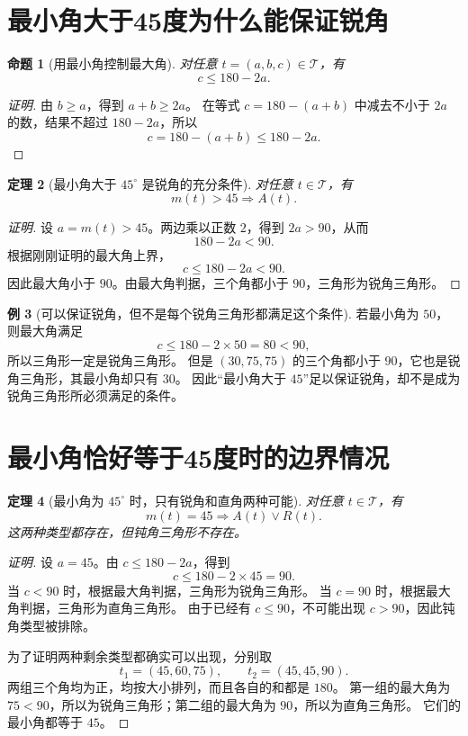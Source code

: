 \documentclass[UTF8,a4paper,zihao=-4,oneside,openany,fontset=fandol]{ctexbook}
\newtheorem{theorem}{定理}[chapter]
\newtheorem{proposition}[theorem]{命题}
\theoremstyle{definition}
\newtheorem{example}[theorem]{例}
\theoremstyle{remark}
\begin{document}
\section{最小角大于45度为什么能保证锐角}

\begin{proposition}[用最小角控制最大角]
对任意 $t=(a,b,c)\in\mathcal T$，有
\[
c\le180-2a.
\]
\end{proposition}

\begin{proof}[证明]
由 $b\ge a$，得到 $a+b\ge2a$。
在等式 $c=180-(a+b)$ 中减去不小于 $2a$ 的数，结果不超过 $180-2a$，所以
\[
c=180-(a+b)\le180-2a.
\]
\end{proof}

\begin{theorem}[最小角大于 $45^\circ$ 是锐角的充分条件]
对任意 $t\in\mathcal T$，有
\[
m(t)>45\Longrightarrow A(t).
\]
\end{theorem}

\begin{proof}[证明]
设 $a=m(t)>45$。两边乘以正数 $2$，得到 $2a>90$，从而
\[
180-2a<90.
\]
根据刚刚证明的最大角上界，
\[
c\le180-2a<90.
\]
因此最大角小于 $90$。由最大角判据，三个角都小于 $90$，三角形为锐角三角形。
\end{proof}

\begin{example}[可以保证锐角，但不是每个锐角三角形都满足这个条件]
若最小角为 $50$，则最大角满足
\[
c\le180-2\times50=80<90,
\]
所以三角形一定是锐角三角形。
但是 $(30,75,75)$ 的三个角都小于 $90$，它也是锐角三角形，其最小角却只有 $30$。
因此“最小角大于 $45$”足以保证锐角，却不是成为锐角三角形所必须满足的条件。
\end{example}

\section{最小角恰好等于45度时的边界情况}

\begin{theorem}[最小角为 $45^\circ$ 时，只有锐角和直角两种可能]
对任意 $t\in\mathcal T$，有
\[
m(t)=45\Longrightarrow A(t)\lor R(t).
\]
这两种类型都存在，但钝角三角形不存在。
\end{theorem}

\begin{proof}[证明]
设 $a=45$。由 $c\le180-2a$，得到
\[
c\le180-2\times45=90.
\]
当 $c<90$ 时，根据最大角判据，三角形为锐角三角形。
当 $c=90$ 时，根据最大角判据，三角形为直角三角形。
由于已经有 $c\le90$，不可能出现 $c>90$，因此钝角类型被排除。

为了证明两种剩余类型都确实可以出现，分别取
\[
t_1=(45,60,75),\qquad t_2=(45,45,90).
\]
两组三个角均为正，均按大小排列，而且各自的和都是 $180$。
第一组的最大角为 $75<90$，所以为锐角三角形；第二组的最大角为 $90$，所以为直角三角形。
它们的最小角都等于 $45$。
\end{proof}
\end{document}
